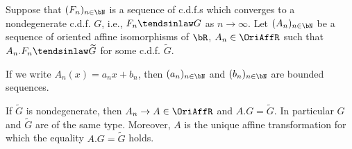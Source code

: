 \begin{theorem}
  \label{thm:convergence-to-types}
  Suppose that $(F_n)_{n \in \bN}$ is a sequence of
  c.d.f.s which converges to a nondegenerate c.d.f. $G$, i.e.,
  $F_n \tendsinlaw G$ as $n \to \infty$.
  Let $(A_n)_{n \in \bN}$ be a sequence of oriented
  affine isomorphisms of $\bR$, $A_n \in \OriAffR$
  such that $A_n.F_n \tendsinlaw \widetilde{G}$ for some c.d.f.
  $\widetilde{G}$.

  If we write $A_n(x) = a_n x + b_n$, then $(a_n)_{n \in \bN}$
  and $(b_n)_{n \in \bN}$ are bounded sequences.

  If $\widetilde{G}$ is nondegenerate, then
  $A_n \to A \in \OriAffR$ and $A.G = \widetilde{G}$.
  In particular $G$ and $\widetilde{G}$ are of the same type.
  Moreover, $A$ is the unique affine transformation for which
  the equality $A.G = \widetilde{G}$ holds.
\end{theorem}
